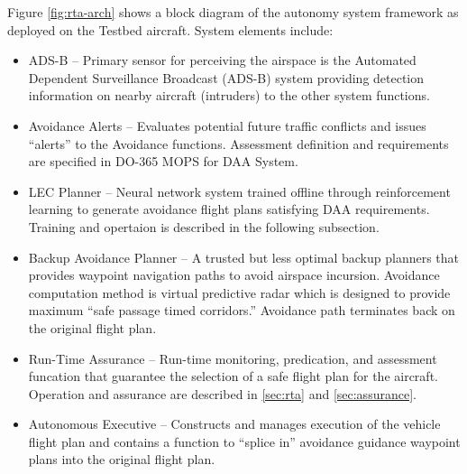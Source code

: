 Figure \ref{fig:rta-arch} shows a block diagram of the autonomy system framework as deployed on the Testbed aircraft.
System elements include: 
\begin{itemize}
\item ADS-B – Primary sensor for perceiving the airspace is the Automated Dependent Surveillance Broadcast (ADS-B) system providing detection information on  nearby aircraft (intruders) to the other system functions.
\item Avoidance Alerts – Evaluates potential future traffic conflicts and issues “alerts” to the Avoidance functions.  Assessment definition and requirements are specified in DO-365 MOPS for DAA System.
\item LEC Planner -- Neural network system trained offline through reinforcement learning to generate avoidance flight plans satisfying DAA requirements.  Training and opertaion is described in the following subsection.  
\item Backup Avoidance Planner – A trusted but less optimal backup planners that provides waypoint navigation paths to avoid airspace incursion.  Avoidance computation method is virtual predictive radar which is designed to provide maximum ``safe passage timed corridors.''  Avoidance path terminates back on the original flight plan.
\item Run-Time Assurance  – Run-time monitoring, predication, and assessment funcation that guarantee the selection of a safe flight plan for the aircraft.  Operation and assurance are described in \ref{sec:rta} and \ref{sec:assurance}.
\item Autonomous Executive – Constructs and manages execution of the vehicle flight plan and contains a function to ``splice in'' avoidance guidance waypoint plans into the original flight plan.
\end{itemize}

